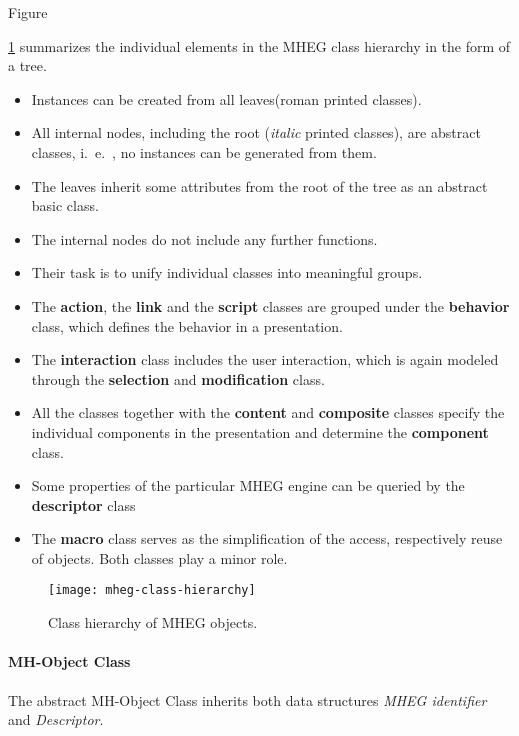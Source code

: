 Figure {\ref{fig:mheg-class-hierarchy} summarizes the individual elements in the MHEG class hierarchy in the form of a tree. 
\begin{multicols}{2}
	\begin{itemize}
		\item Instances can be created from all leaves(roman printed classes). 
		\item All internal nodes, including the root (\textit{italic} printed classes), are abstract classes, i.\ e.\ , no instances can be generated from them. 
		\item The leaves inherit some attributes from the root of the tree as an abstract basic class. 
		\item The internal nodes do not include any	further functions. 
		\item Their task is to unify individual classes into meaningful groups.
		\item The \textbf{action}, the \textbf{link} and the \textbf{script} classes are grouped under the \textbf{behavior} class, which defines the behavior in a presentation. 
		\item The \textbf{interaction} class includes the user interaction, which is again modeled through the \textbf{selection} and \textbf{modification} class. 
		\item All the classes together with the \textbf{content} and \textbf{composite} classes specify the individual components in the presentation and determine the \textbf{component} class. 
		\item Some properties of the particular MHEG engine can be queried by the \textbf{descriptor} class
		\item The \textbf{macro}	class serves as the simplification of the access, respectively reuse of objects. Both classes play a minor role.
	\end{itemize}
\end{multicols}


\begin{figure}[ht!]
	\centering
	\texttt{[image: mheg-class-hierarchy]}
	\caption{Class hierarchy of MHEG objects.}{\label{fig:mheg-class-hierarchy}}
\end{figure}

\paragraph*{MH-Object Class}
The abstract MH-Object Class inherits both data structures \textit{MHEG identifier} and \textit{Descriptor}.

}

